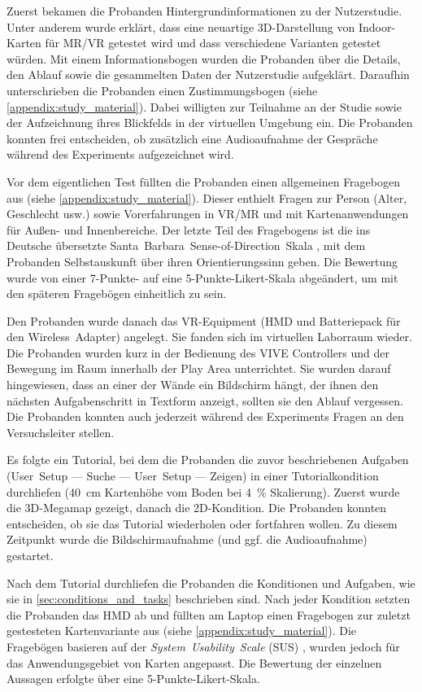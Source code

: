 Zuerst bekamen die Probanden Hintergrundinformationen zu der Nutzerstudie.
Unter anderem wurde erklärt, dass eine neuartige 3D-Darstellung von Indoor-Karten für MR/VR getestet wird und dass verschiedene Varianten getestet würden.
Mit einem Informationsbogen wurden die Probanden über die Details, den Ablauf sowie die gesammelten Daten der Nutzerstudie aufgeklärt.
Daraufhin unterschrieben die Probanden einen Zustimmungsbogen (siehe \autoref{appendix:study_material}).
Dabei willigten zur Teilnahme an der Studie sowie der Aufzeichnung ihres Blickfelds in der virtuellen Umgebung ein.
Die Probanden konnten frei entscheiden, ob zusätzlich eine Audioaufnahme der Gespräche während des Experiments aufgezeichnet wird.

Vor dem eigentlichen Test füllten die Probanden einen allgemeinen Fragebogen aus (siehe \autoref{appendix:study_material}).
Dieser enthielt Fragen zur Person (Alter, Geschlecht usw.) sowie Vorerfahrungen in VR/MR und mit Kartenanwendungen für Außen- und Innenbereiche. Der letzte Teil des Fragebogens ist die ins Deutsche übersetzte Santa~Barbara~Sense-of-Direction~Skala \parencite{Hegarty2002}, mit dem Probanden Selbstauskunft über ihren Orientierungssinn geben.
Die Bewertung wurde von einer 7-Punkte- auf eine 5-Punkte-Likert-Skala abgeändert, um mit den späteren Fragebögen einheitlich zu sein.

Den Probanden wurde danach das VR-Equipment (HMD und Batteriepack für den Wireless~Adapter) angelegt.
Sie fanden sich im virtuellen Laborraum wieder.
Die Probanden wurden kurz in der Bedienung des VIVE Controllers und der Bewegung im Raum innerhalb der Play Area unterrichtet.
Sie wurden darauf hingewiesen, dass an einer der Wände ein Bildschirm hängt, der ihnen den nächsten Aufgabenschritt in Textform anzeigt, sollten sie den Ablauf vergessen.
Die Probanden konnten auch jederzeit während des Experiments Fragen an den Versuchsleiter stellen.

Es folgte ein Tutorial, bei dem die Probanden die zuvor beschriebenen Aufgaben (User~Setup --- Suche --- User~Setup --- Zeigen) in einer Tutorialkondition durchliefen (\SI{40}{\cm} Kartenhöhe vom Boden bei \SI{4}{\percent} Skalierung).
Zuerst wurde die 3D-Megamap gezeigt, danach die 2D-Kondition.
Die Probanden konnten entscheiden, ob sie das Tutorial wiederholen oder fortfahren wollen.
Zu diesem Zeitpunkt wurde die Bildschirmaufnahme (und ggf. die Audioaufnahme) gestartet.

Nach dem Tutorial durchliefen die Probanden die Konditionen und Aufgaben, wie sie in \autoref{sec:conditions_and_tasks} beschrieben sind.
Nach jeder Kondition setzten die Probanden das HMD ab und füllten am Laptop einen Fragebogen zur zuletzt gestesteten Kartenvariante aus (siehe \autoref{appendix:study_material}).
Die Fragebögen basieren auf der \emph{System~Usability~Scale} (SUS) \autocite{Brooke2013}, wurden jedoch für das Anwendungsgebiet von Karten angepasst.
Die Bewertung der einzelnen Aussagen erfolgte über eine 5-Punkte-Likert-Skala.

